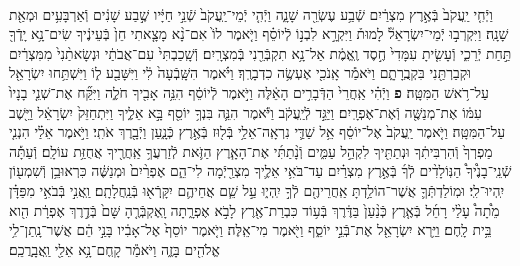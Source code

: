 \documentclass[twoside, openany, parskip=half, 11pt]{book}
\begin{document}
\begin{footnotesize}
\begin{multicols}{2}
\\
וַיְֿחִ֤י יַֽעֲקֹב֙ בְּֿאֶ֣רֶץ מִצְרַ֔יִם שְֿׁבַ֥ע עֶשְׂרֵ֖ה שָׁנָ֑ה וַיְֿהִ֤י יְֿמֵי־יַֽעֲקֹב֙ שְֿׁנֵ֣י חַיָּ֔יו שֶׁ֣בַע שָׁנִ֔ים וְֿאַרְבָּעִ֥ים וּמְאַ֖ת שָׁנָֽה׃ וַיִּקְרְב֣וּ יְֿמֵי־יִשְׂרָאֵל֘ לָמוּת֒ וַיִּקְרָ֣א לִבְנ֣וֹ לְֿיוֹסֵ֗ף וַיֹּ֤אמֶר לוֹ֙ אִם־נָ֨א מָצָ֤אתִי חֵן֙ בְּֿעֵינֶ֔יךָ שִׂים־נָ֥א יָֽדְֿךָ֖ תַּ֣חַת יְֿרֵכִ֑י וְֿעָשִׂ֤יתָ עִמָּדִי֙ חֶ֣סֶד וֶֽאֱמֶ֔ת אַל־נָ֥א תִקְבְּֿרֵ֖נִי בְּֿמִצְרָֽיִם׃ וְֿשָֽׁכַבְתִּי֙ עִם־אֲבֹתַ֔י וּנְשָׂאתַ֨נִי֙ מִמִּצְרַ֔יִם וּקְבַרְתַּ֖נִי בִּקְבֻֽרָתָ֑ם וַיֹּאמַ֕ר אָֽנֹכִ֖י אֶעְשֶׂ֥ה כִדְבָרֶֽךָ׃ וַיֹּ֗אמֶר הִשָּֽׁבְֿעָה֙ לִ֔י וַיִּשָּׁבַ֖ע ל֑וֹ וַיִּשְׁתַּ֥חוּ יִשְׂרָאֵ֖ל עַל־רֹ֥אשׁ הַמִּטָּֽה׃ \textbf{פ}
וַיְֿהִ֗י אַֽחֲרֵי֙ הַדְּֿבָרִ֣ים הָאֵ֔לֶּה וַיֹּ֣אמֶר לְֿיוֹסֵ֔ף הִנֵּ֥ה אָבִ֖יךָ חֹלֶ֑ה וַיִּקַּ֞ח אֶת־שְׁנֵ֤י בָנָיו֙ עִמּ֔וֹ אֶת־מְנַשֶּׁ֖ה וְֿאֶת־אֶפְרָֽיִם׃ וַיַּגֵּ֣ד לְֿיַֽעֲקֹ֔ב וַיֹּ֕אמֶר הִנֵּ֛ה בִּנְךָ֥ יוֹסֵ֖ף בָּ֣א אֵלֶ֑יךָ וַיִּתְחַזֵּק֙ יִשְׂרָאֵ֔ל וַיֵּ֖שֶׁב עַל־הַמִּטָּֽה׃ וַיֹּ֤אמֶר יַֽעֲקֹב֙ אֶל־יוֹסֵ֔ף אֵ֥ל שַׁדַּ֛י נִרְאָֽה־אֵלַ֥י בְּֿל֖וּז בְּֿאֶ֣רֶץ כְּֿנָ֑עַן וַיְֿבָ֖רֶךְ אֹתִֽי׃  וַיֹּ֣אמֶר אֵלַ֗י הִנְנִ֤י מַפְרְךָ֙ וְֿהִרְבִּיתִ֔ךָ וּנְתַתִּ֖יךָ לִקְהַ֣ל עַמִּ֑ים וְֿנָ֨תַתִּ֜י אֶת־הָאָ֧רֶץ הַזֹּ֛את לְֿזַרְעֲךָ֥ אַֽחֲרֶ֖יךָ אֲחֻזַּ֥ת עוֹלָֽם׃ וְֿעַתָּ֡ה שְֿׁנֵֽי־בָנֶ֩יךָ֩ הַנּֽוֹלָדִ֨ים לְֿךָ֜ בְּֿאֶ֣רֶץ מִצְרַ֗יִם עַד־בֹּאִ֥י אֵלֶ֛יךָ מִצְרַ֖יְֿמָה לִי־הֵ֑ם אֶפְרַ֨יִם֙ וּמְנַשֶּׁ֔ה כִּרְאוּבֵ֥ן וְֿשִׁמְע֖וֹן יִֽהְיוּ־לִֽי׃ וּמֽוֹלַדְתְּֿךָ֛ אֲשֶׁר־הוֹלַ֥דְתָּ אַֽחֲרֵיהֶ֖ם לְֿךָ֣ יִֽהְי֑וּ עַ֣ל שֵׁ֧ם אֲחֵיהֶ֛ם יִקָּֽרְֿא֖וּ בְּֿנַֽחֲלָתָֽם׃ וַֽאֲנִ֣י בְּֿבֹאִ֣י מִפַּדָּ֗ן מֵ֩תָה֩ עָלַ֨י רָחֵ֜ל בְּֿאֶ֤רֶץ כְּֿנַ֨עַן֙ בַּדֶּ֔רֶךְ בְּֿע֥וֹד כִּבְרַת־אֶ֖רֶץ לָבֹ֣א אֶפְרָ֑תָה וָֽאֶקְבְּֿרֶ֤הָ שָּׁם֙ בְּֿדֶ֣רֶךְ אֶפְרָ֔ת הִ֖וא בֵּ֥ית לָֽחֶם׃ וַיַּ֥רְא יִשְׂרָאֵ֖ל אֶת־בְּֿנֵ֣י יוֹסֵ֑ף וַיֹּ֖אמֶר מִי־אֵֽלֶּה׃ וַיֹּ֤אמֶר יוֹסֵף֙ אֶל־אָבִ֔יו בָּנַ֣י הֵ֔ם אֲשֶׁר־נָֽתַן־לִ֥י אֱלֹהִ֖ים בָּזֶ֑ה וַיֹּאמַ֕ר קָֽחֶם־נָ֥א אֵלַ֖י וַֽאֲבָֽרֲכֵֽם׃


\end{multicols}
\end{footnotesize}
\end{document}

